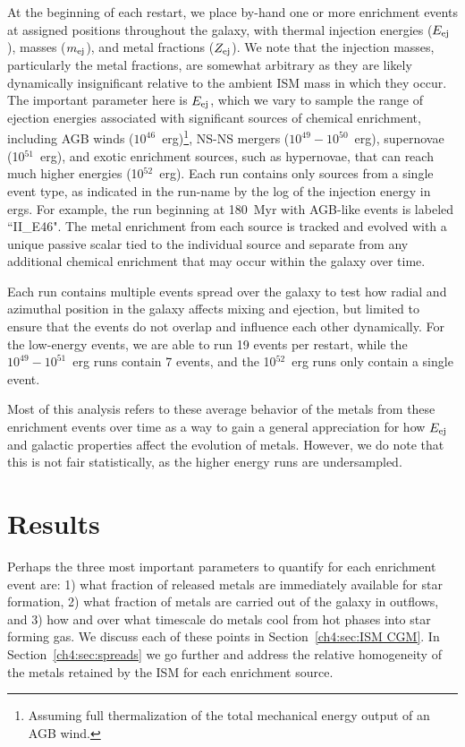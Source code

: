 At the beginning of each restart, we place by-hand one or more enrichment events at assigned positions throughout the galaxy, with thermal injection energies ($E_{\rm ej}$), masses ($m_{\rm ej}$), and metal fractions ($Z_{\rm ej}$). We note that the injection masses, particularly the metal fractions, are somewhat arbitrary as they are likely dynamically insignificant relative to the ambient ISM mass in which they occur. The important parameter here is $E_{\rm ej}$, which we vary to sample the range of ejection energies associated with significant sources of chemical enrichment, including AGB winds ($10^{46}$~erg)\footnote{Assuming full thermalization of the total mechanical energy output of an AGB wind.}, NS-NS mergers ($10^{49} - 10^{50}$~erg), supernovae (10$^{51}$~erg), and exotic enrichment sources, such as hypernovae, that can reach much higher energies (10$^{52}$~erg). Each run contains only sources from a single event type, as indicated in the run-name by the log of the injection energy in ergs. For example, the run beginning at 180~Myr with AGB-like events is labeled ``II\_E46". The metal enrichment from each source is tracked and evolved with a unique passive scalar tied to the individual source and separate from any additional chemical enrichment that may occur within the galaxy over time.

Each run contains multiple events spread over the galaxy to test how radial and azimuthal position in the galaxy affects mixing and ejection, but limited to ensure that the events do not overlap and influence each other dynamically. For the low-energy events, we are able to run 19 events per restart, while the $10^{49}-10^{51}$~erg runs contain 7 events, and the 10$^{52}$~erg runs only contain a single event.

Most of this analysis refers to these average behavior of the metals from these enrichment events over time as a way to gain a general appreciation for how $E_{\rm ej}$ and galactic properties affect the evolution of metals. However, we do note that this is not fair statistically, as the higher energy runs are undersampled.



\section{Results}

Perhaps the three most important parameters to quantify for each enrichment event are: 1) what fraction of released metals are immediately available for star formation, 2) what fraction of metals are carried out of the galaxy in outflows, and 3) how and over what timescale do metals cool from hot phases into star forming gas. We discuss each of these points in Section~\ref{ch4:sec:ISM CGM}. In Section~\ref{ch4:sec:spreads} we go further and address the relative homogeneity of the metals retained by the ISM for each enrichment source.

